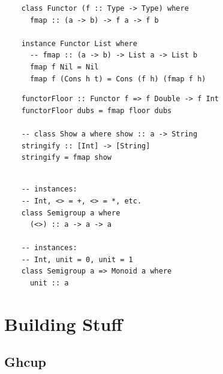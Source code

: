 \documentclass[tikz]{beamer}
\theoremstyle{definition}
\begin{document}



\begin{frame}[fragile]
\begin{center}
	\begin{verbatim}
	class Functor (f :: Type -> Type) where 
	  fmap :: (a -> b) -> f a -> f b
	  
	instance Functor List where 
	  -- fmap :: (a -> b) -> List a -> List b
	  fmap f Nil = Nil
	  fmap f (Cons h t) = Cons (f h) (fmap f h)
	\end{verbatim}
\end{center}
\end{frame}

\begin{frame}[fragile]
\begin{center}
	\begin{verbatim}
	functorFloor :: Functor f => f Double -> f Int
	functorFloor dubs = fmap floor dubs
	
	-- class Show a where show :: a -> String
	stringify :: [Int] -> [String]
	stringify = fmap show
	\end{verbatim}
\end{center}
\end{frame}

\begin{frame}[fragile]
\begin{center}
	\begin{verbatim}
	
	-- instances: 
	-- Int, <> = +, <> = *, etc.
	class Semigroup a where 
	  (<>) :: a -> a -> a
	  
	-- instances: 
	-- Int, unit = 0, unit = 1
	class Semigroup a => Monoid a where 
	  unit :: a
	\end{verbatim}
\end{center}
\end{frame}


\section{Building Stuff}

\subsection{Ghcup}
\end{document}
